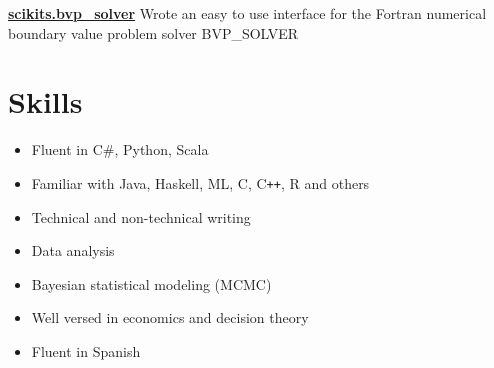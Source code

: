 \documentclass[margin]{res}
\newcommand{\bitem}{\begin{itemize} \itemsep -2pt}
\newcommand{\eitem}{\end{itemize} }
\begin{document}
\begin{resume}
    {\bf \href{packages.python.org/scikits.bvp\_solver}{scikits.bvp\_solver}} Wrote an easy to use interface for the Fortran numerical \\
      boundary value problem solver BVP\_SOLVER \\ 

  \section{Skills}
    \bitem
      \item Fluent in C\#, Python, Scala
      \item Familiar with Java, Haskell, ML, C, C\verb!++!, R and others
      \item Technical and non-technical writing
      \item Data analysis
      \item Bayesian statistical modeling (MCMC)
      \item Well versed in economics and decision theory
      \item Fluent in Spanish
    \eitem

\end{resume} 
\end{document}

